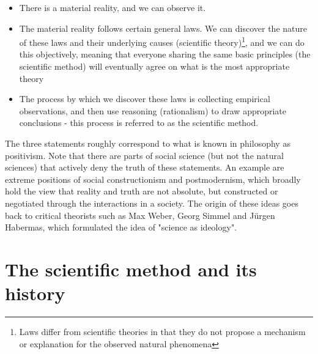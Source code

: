 \documentclass{tufte-book}
\begin{document}
\begin{itemize}
\item There is a material reality, and we can observe it.
\item The material reality follows certain general laws. We can discover the nature of these laws and their underlying causes (scientific theory)\footnote{Laws differ from scientific theories in that they do not propose a mechanism or explanation for the observed natural phenomena}, and we can do this objectively, meaning that everyone sharing the same basic principles (the scientific method) will eventually agree on what is the most appropriate theory
\item The process by which we discover these laws is collecting empirical observations, and then use reasoning (rationalism) to draw appropriate conclusions - this process is referred to as the scientific method.
\end{itemize}

The three statements roughly correspond to what is known in philosophy as positivism. Note that there are parts of social science (but not the natural sciences) that actively deny the truth of these statements. An example are extreme positions of social constructionism and postmodernism, which broadly hold the view that reality and truth are not absolute, but constructed or negotiated through the interactions in a society. The origin of these ideas goes back to critical theorists such as Max Weber, Georg Simmel and Jürgen Habermas, which formulated the idea of "science as ideology".



\section{The scientific method and its history}\label{sec: scientific method}

\end{document}
